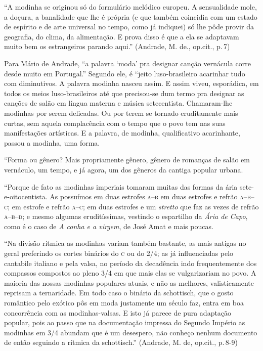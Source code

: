 ``A modinha se originou só do formulário melódico europeu. A sensualidade
mole, a doçura, a banalidade que lhe é própria (e que também coincidia
com um estado de espírito e de arte universal no tempo, como já
indiquei) só lhe pôde provir da geografia, do clima, da alimentação. E
prova disso é que a ela se adaptavam muito bem os estrangeiros parando
aqui.'' (Andrade, M. de., op.cit., p.\,7)

Para Mário de Andrade, ``a palavra `moda' pra designar canção vernácula
corre desde muito em Portugal.'' Segundo ele, é ``jeito luso-brasileiro
acarinhar tudo com diminutivos. A palavra modinha nasceu assim. E assim
viveu, esporádica, em todos os meios luso-brasileiros até que
precisou-se dum termo pra designar as canções de salão em língua materna
e música setecentista. Chamaram-lhe modinhas por serem delicadas. Ou por
terem se tornado eruditamente mais curtas, sem aquela complacência com o
tempo que o povo tem nas suas manifestações artísticas. E a palavra, de
modinha, qualificativo acarinhante, passou a modinha, uma forma.

``Forma ou gênero? Mais propriamente gênero, gênero de romanças de salão
em vernáculo, um tempo, e já agora, um dos gêneros da cantiga popular
urbana.

``Porque de fato as modinhas imperiais tomaram muitas das formas da ária
sete-e-oitocentista. As possuímos em duas estrofes \textsc{a}--\textsc{b} em duas
estrofes e refrão \textsc{a}--\textsc{b}--\textsc{c}; em estrofe e refrão \textsc{a}--\textsc{c}; em duas estrofes
e um \textit{stretto} que faz as vezes de refrão \textsc{a}--\textsc{b}--\textsc{d}; e mesmo algumas
eruditíssimas, vestindo o espartilho da \textit{Ária de Capo}, como é o
caso de \textit{A conha e a virgem}, de José Amat e mais poucas.

``Na divisão rítmica as modinhas variam também bastante, as mais antigas
no geral preferindo os cortes binários do \textsc{c} ou do 2/4; as já
influenciadas pelo cantabile italiano e pela valsa, no período da
decadência indo frequentemente dos compassos compostos ao pleno 3/4 em
que mais elas se vulgarizariam no povo. A maioria das nossas modinhas
populares atuais, e não as melhores, valisticamente reprisam a
ternaridade. Em todo caso o binário da schottisch, que o gosto romântico
pelo exótico pôs em moda justamente um século faz, entra em boa
concorrência com as modinhas-valsas. E isto já parece de pura adaptação
popular, pois ao passo que na documentação impressa do Segundo Império
as modinhas em 3/4 abundam que é um desespero, não conheço nenhum
documento de então seguindo a rítmica da schottisch.'' (Andrade, M. de,
op.cit., p.\,8-9)

